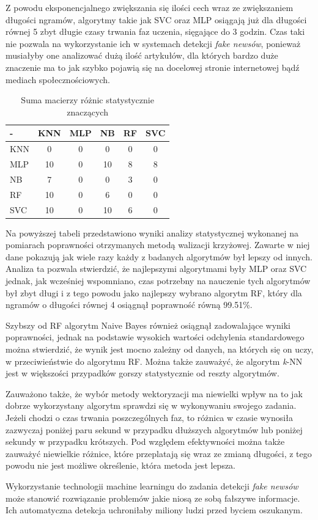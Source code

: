 Z powodu eksponencjalnego zwiększania się ilości cech wraz ze zwiększaniem długości ngramów, 
algorytmy takie jak SVC oraz MLP osiągają już dla długości równej 5 zbyt długie czasy trwania faz uczenia, sięgające 
do 3 godzin. Czas taki nie pozwala na wykorzystanie ich w systemach detekcji \textit{fake newsów}, ponieważ
musiałyby one analizować dużą ilość artykułów, dla których bardzo duże znaczenie ma to jak 
szybko pojawią się na docelowej stronie internetowej bądź mediach społecznościowych.

\begin{table}[H]
    \centering
    \caption{Suma macierzy różnic statystycznie znaczących}
    \begin{tabular}{ | l | c | c | c | c | c |}
        \hline
        - & KNN & MLP & NB & RF & SVC   \\ \hline
        KNN & 0 & 0 & 0 & 0 & 0   \\ \hline
        MLP & 10 & 0 & 10 & 8 & 8  \\ \hline
        NB & 7 & 0 & 0 & 3 & 0  \\ \hline
        RF & 10 & 0 & 6 & 0 & 0  \\ \hline
        SVC & 10 & 0 & 10 & 6 & 0  \\ \hline
    \end{tabular}
\end{table}
Na powyższej tabeli przedstawiono wyniki analizy statystycznej wykonanej na pomiarach poprawności otrzymanych 
metodą walizacji krzyżowej. Zawarte w niej dane pokazują jak wiele razy 
każdy z badanych algorytmów był lepszy od innych. Analiza ta 
pozwala stwierdzić, że najlepszymi algorytmami były MLP oraz SVC
jednak, jak wcześniej wspomniano, czas potrzebny na nauczenie tych 
algorytmów był zbyt długi i z tego powodu jako najlepszy wybrano algorytm RF, 
który dla ngramów o długości równej 4 osiągnął poprawność równą 99.51\%.


Szybszy od RF algorytm Naive Bayes również osiągnął zadowalające wyniki 
poprawności, jednak na podstawie wysokich wartości odchylenia 
standardowego  można stwierdzić, że wynik jest mocno zależny od danych, 
na których się on uczy, w przeciwieństwie do algorytmu RF.  Można 
także zauważyć, że algorytm 
\textit{k}-NN jest w większości przypadków gorszy statystycznie od reszty
algorytmów. 

Zauważono także, że wybór metody wektoryzacji ma niewielki wpływ na to jak dobrze wykorzystany algorytm 
sprawdzi się w wykonywaniu swojego zadania. Jeżeli chodzi o czas trwania poszczególnych faz, to 
różnica w czasie wynosiła zazwyczaj poniżej paru sekund w przypadku dłuższych algorytmów lub poniżej 
sekundy w przypadku krótszych. Pod względem efektywności można także zauważyć niewielkie różnice,
które przeplatają się
wraz ze zmianą długości, z tego powodu nie jest możliwe określenie, która metoda jest lepsza.

Wykorzystanie technologii machine learningu do zadania detekcji \textit{fake newsów} 
może stanowić rozwiązanie problemów jakie niosą ze sobą fałszywe informacje. Ich automatyczna 
detekcja uchroniłaby miliony ludzi przed byciem oszukanym. 

